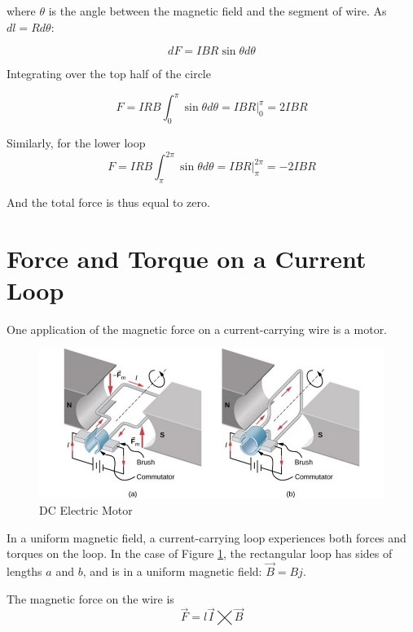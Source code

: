 \documentclass[14pt]{memoir}
\begin{document}
where $\theta$ is the angle between the magnetic field and the segment of wire. As $dl =  R d\theta$:

\begin{equation}
dF = IBR \sin{\theta} d\theta
\end{equation}

Integrating over the top half of the circle

\begin{equation}
F = IRB \int_0^{\pi} \sin{\theta} d\theta = IBR \bigg\rvert_{0}^{\pi} = 2IBR
\end{equation}

Similarly, for the lower loop
\begin{equation}
F = IRB \int_{\pi}^{2\pi} \sin{\theta} d\theta = IBR \bigg\rvert_{\pi}^{2\pi} = -2IBR
\end{equation}

And the total force is thus equal to zero.

\section{Force and Torque on a Current Loop}

One application of the magnetic force on a current-carrying wire is a motor. 

\begin{figure}[H]
\begin{center}
\includegraphics[scale=0.50]{fig/fig_11_15.jpg}
\caption{DC Electric Motor}
\label{fig:11_15}
\end{center}
\end{figure}

In a uniform magnetic field, a current-carrying loop experiences both forces and torques on the loop. In the case of Figure \ref{fig:11_15}, the rectangular loop has sides of lengths $a$ and $b$, and is in a uniform magnetic field: $\vec{B} = B \hat{j}$.

The magnetic force on the wire is 
\begin{equation}
\vec{F} = l \vec{I} \bigtimes \vec{B}
\end{equation}
\end{document}
